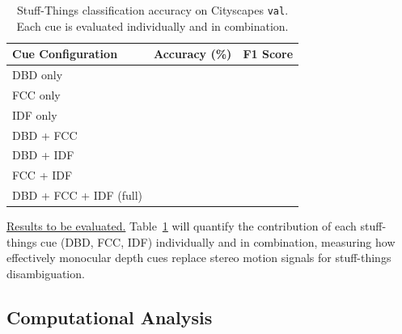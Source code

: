 \documentclass{article}
\begin{document}
\begin{table}[t]
\centering
\caption{Stuff-Things classification accuracy on Cityscapes \texttt{val}. Each cue is evaluated individually and in combination.}
\label{tab:stc_analysis}
\begin{tabular}{lcc}
\toprule
\textbf{Cue Configuration} & \textbf{Accuracy (\%)} & \textbf{F1 Score} \\
\midrule
DBD only & \underline{\hspace{2em}} & \underline{\hspace{2em}} \\
FCC only & \underline{\hspace{2em}} & \underline{\hspace{2em}} \\
IDF only & \underline{\hspace{2em}} & \underline{\hspace{2em}} \\
DBD + FCC & \underline{\hspace{2em}} & \underline{\hspace{2em}} \\
DBD + IDF & \underline{\hspace{2em}} & \underline{\hspace{2em}} \\
FCC + IDF & \underline{\hspace{2em}} & \underline{\hspace{2em}} \\
\midrule
DBD + FCC + IDF (full) & \underline{\hspace{2em}} & \underline{\hspace{2em}} \\
\bottomrule
\end{tabular}
\end{table}

\underline{Results to be evaluated.} Table~\ref{tab:stc_analysis} will quantify the contribution of each stuff-things cue (DBD, FCC, IDF) individually and in combination, measuring how effectively monocular depth cues replace stereo motion signals for stuff-things disambiguation.


\subsection{Computational Analysis}
\end{document}
